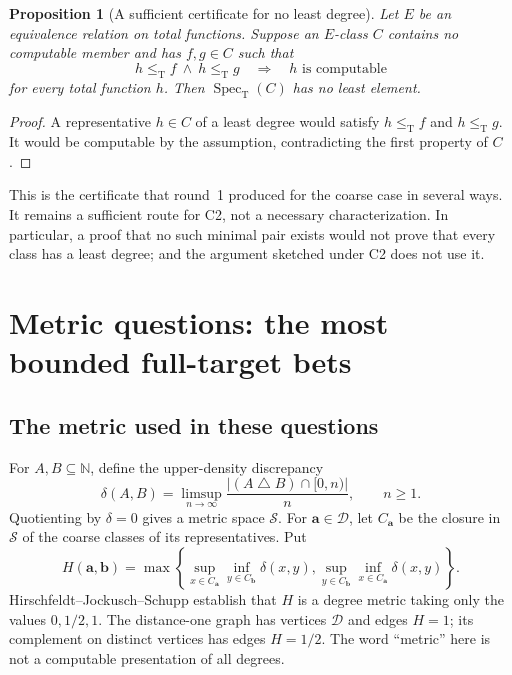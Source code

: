 \documentclass[11pt,a4paper]{article}
\newcommand{\N}{\mathbb N}
\newcommand{\D}{\mathcal D}
\newcommand{\leT}{\leq_{\mathrm T}}
\newcommand{\adeg}{\mathbf a}\newcommand{\bdeg}{\mathbf b}
\newcommand{\Spec}{\operatorname{Spec}_{\mathrm T}}\newcommand{\Up}{\operatorname{Up}}
\newtheorem{proposition}[theorem]{Proposition}
\theoremstyle{definition}\newtheorem{definition}[theorem]{Definition}
\theoremstyle{remark}\newtheorem{remark}[theorem]{Remark}
\begin{document}
\begin{proposition}[A sufficient certificate for no least degree]\label{prop:minpair}
Let $E$ be an equivalence relation on total functions. Suppose an $E$-class $C$ contains no computable member and has $f,g\in C$ such that
\[
          h\leT f\ \land\ h\leT g\quad\Longrightarrow\quad
          h\text{ is computable}
\]
for every total function $h$. Then $\Spec(C)$ has no least element.
\end{proposition}
\begin{proof}
A representative $h\in C$ of a least degree would satisfy $h\leT f$ and $h\leT g$. It would be computable by the assumption, contradicting the first property of $C$.
\end{proof}
This is the certificate that round~1 produced for the coarse case in several ways. It remains a sufficient route for C2, not a necessary characterization. In particular, a proof that no such minimal pair exists would not prove that every class has a least degree; and the argument sketched under C2 does not use it.



\section{Metric questions: the most bounded full-target bets}
\label{sec:metric}

\subsection{The metric used in these questions}

For $A,B\subseteq\N$, define the upper-density discrepancy
\[
 \delta(A,B)=\limsup_{n\to\infty}
       \frac{|(A\mathbin\triangle B)\cap[0,n)|}{n},
 \qquad n\geq 1.
\]
Quotienting by $\delta=0$ gives a metric space $\mathcal S$. For $\adeg\in\D$, let $C_{\adeg}$ be the closure in $\mathcal S$ of the coarse classes of its representatives. Put
\begin{equation}\label{eq:H}
 H(\adeg,\bdeg)=\max\left\{
 \sup_{x\in C_{\adeg}}\inf_{y\in C_{\bdeg}}\delta(x,y),
 \sup_{y\in C_{\bdeg}}\inf_{x\in C_{\adeg}}\delta(x,y)
 \right\}.
\end{equation}
Hirschfeldt--Jockusch--Schupp establish that $H$ is a degree metric taking only the values $0,1/2,1$.\cite{HJS} The distance-one graph has vertices $\D$ and edges $H=1$; its complement on distinct vertices has edges $H=1/2$. The word ``metric'' here is not a computable presentation of all degrees.
\end{document}
